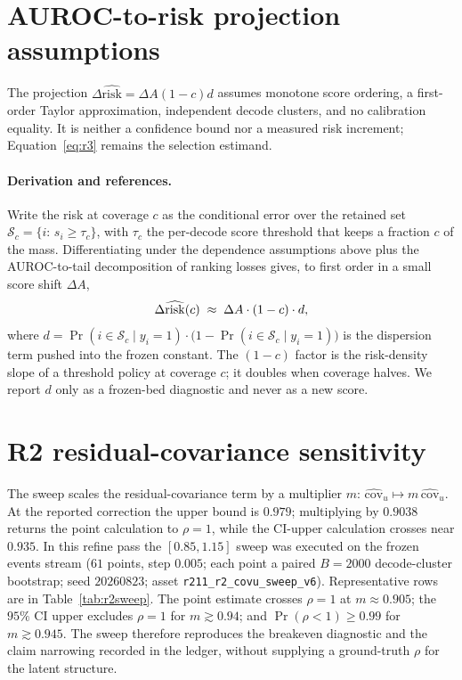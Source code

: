 \documentclass{article}
\begin{document}
\section{AUROC-to-risk projection assumptions}
\label{app:bridge}

The projection $\Delta\widehat{\mathrm{risk}}=\Delta A(1-c)d$ assumes monotone score ordering,
a first-order Taylor approximation, independent decode clusters, and no calibration equality.
It is neither a confidence bound nor a measured risk increment; Equation~\ref{eq:r3} remains the
selection estimand.

\paragraph{Derivation and references.}
Write the risk at coverage $c$ as the conditional error over the retained set
$\mathcal S_c=\{i:\,s_i\ge\tau_c\}$, with $\tau_c$ the per-decode score threshold that keeps a
fraction $c$ of the mass.  Differentiating under the dependence assumptions above
\citep[cf.][for the risk-coverage family]{geifman2017selective,elyaniv2010foundations} plus
the AUROC-to-tail decomposition of ranking losses
\citep{agarwal2005rank,clemencon2008ranking} gives, to first order in a small score shift
$\Delta A$,
\begin{equation}
\Delta\widehat{\mathrm{risk}}(c)\;\approx\;\Delta A\cdot(1-c)\cdot d,
\notag
\end{equation}
where $d=\Pr(i\in\mathcal S_c\mid y_i=1)\cdot\bigl(1-\Pr(i\in\mathcal S_c\mid y_i=1)\bigr)$
is the dispersion term pushed into the frozen constant.  The $(1-c)$ factor is the
risk-density slope of a threshold policy at coverage $c$; it doubles when coverage halves.
We report $d$ only as a frozen-bed diagnostic and never as a new score.

\section{R2 residual-covariance sensitivity}
\label{app:r2sens}

The sweep scales the residual-covariance term by a multiplier $m$: $\widehat{\mathrm{cov}}_u
\mapsto m\,\widehat{\mathrm{cov}}_u$.  At the reported correction the upper bound is $0.979$;
multiplying by $0.9038$ returns the point calculation to $\rho=1$, while the CI-upper
calculation crosses near $0.935$.  In this refine pass the $[0.85,1.15]$ sweep was executed on
the frozen events stream ($61$ points, step $0.005$; each point a paired $B=2000$
decode-cluster bootstrap; seed $20260823$; asset
\texttt{r211\_r2\_covu\_sweep\_v6}).  Representative rows are in
Table~\ref{tab:r2sweep}.  The point estimate crosses $\rho=1$ at $m\approx0.905$; the $95\%$
CI upper excludes $\rho=1$ for $m\gtrsim0.94$; and $\Pr(\rho<1)\ge0.99$ for $m\gtrsim0.945$.
The sweep therefore reproduces the breakeven diagnostic and the claim narrowing recorded in the
ledger, without supplying a ground-truth $\rho$ for the latent structure.
\end{document}
